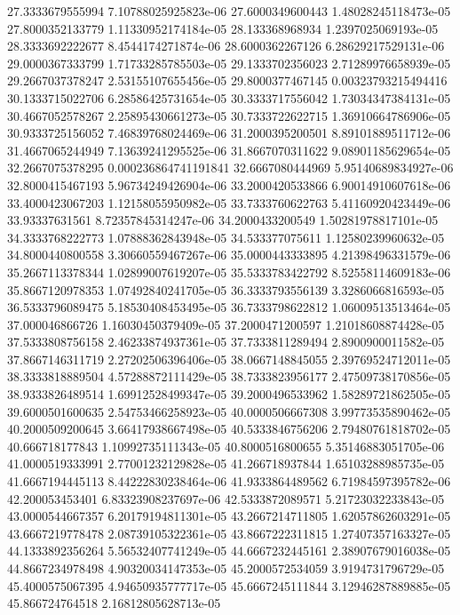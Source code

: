 {27.3333679555994 7.10788025925823e-06
27.6000349600443 1.48028245118473e-05
27.8000352133779 1.11330952174184e-05
28.133368968934 1.2397025069193e-05
28.3333692222677 8.4544174271874e-06
28.6000362267126 6.28629217529131e-06
29.0000367333799 1.71733285785503e-05
29.1333702356023 2.71289976658939e-05
29.2667037378247 2.53155107655456e-05
29.8000377467145 0.00323793215494416
30.1333715022706 6.28586425731654e-05
30.3333717556042 1.73034347384131e-05
30.4667052578267 2.25895430661273e-05
30.7333722622715 1.36910664786906e-05
30.9333725156052 7.46839768024469e-06
31.2000395200501 8.89101889511712e-06
31.4667065244949 7.13639241295525e-06
31.8667070311622 9.08901185629654e-05
32.2667075378295 0.000236864741191841
32.6667080444969 5.95140689834927e-06
32.8000415467193 5.96734249426904e-06
33.2000420533866 6.90014910607618e-06
33.4000423067203 1.12158055950982e-05
33.7333760622763 5.41160920423449e-06
33.93337631561 8.72357845314247e-06
34.2000433200549 1.50281978817101e-05
34.3333768222773 1.07888362843948e-05
34.533377075611 1.12580239960632e-05
34.8000440800558 3.30660559467267e-06
35.0000443333895 4.21398496331579e-06
35.2667113378344 1.02899007619207e-05
35.5333783422792 8.52558114609183e-06
35.8667120978353 1.07492840241705e-05
36.3333793556139 3.3286066816593e-05
36.5333796089475 5.18530408453495e-05
36.7333798622812 1.06009513513464e-05
37.000046866726 1.16030450379409e-05
37.2000471200597 1.21018608874428e-05
37.5333808756158 2.46233874937361e-05
37.7333811289494 2.8900900011582e-05
37.8667146311719 2.27202506396406e-05
38.0667148845055 2.39769524712011e-05
38.3333818889504 4.57288872111429e-05
38.7333823956177 2.47509738170856e-05
38.9333826489514 1.69912528499347e-05
39.2000496533962 1.58289721862505e-05
39.6000501600635 2.54753466258923e-05
40.0000506667308 3.99773535890462e-05
40.2000509200645 3.66417938667498e-05
40.5333846756206 2.79480761818702e-05
40.666718177843 1.10992735111343e-05
40.8000516800655 5.35146883051705e-06
41.0000519333991 2.77001232129828e-05
41.266718937844 1.65103288985735e-05
41.6667194445113 8.44222830238464e-06
41.9333864489562 6.71984597395782e-06
42.200053453401 6.83323908237697e-06
42.5333872089571 5.21723032233843e-05
43.0000544667357 6.20179194811301e-05
43.2667214711805 1.62057862603291e-05
43.6667219778478 2.08739105322361e-05
43.8667222311815 1.27407357163327e-05
44.1333892356264 5.56532407741249e-05
44.6667232445161 2.38907679016038e-05
44.8667234978498 4.90320034147353e-05
45.2000572534059 3.9194731796729e-05
45.4000575067395 4.94650935777717e-05
45.6667245111844 3.12946287889885e-05
45.866724764518 2.16812805628713e-05
}
